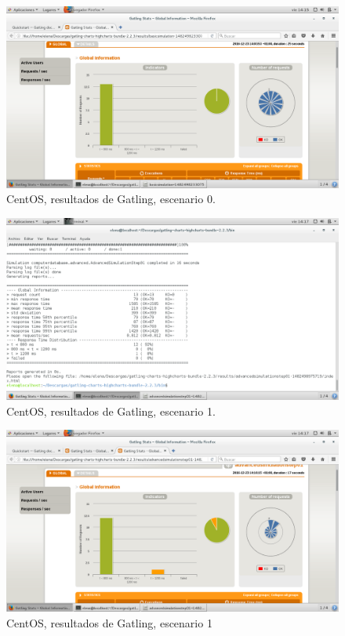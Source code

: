 \begin{figure}[H] 
	\centering
	\includegraphics[width=14.7cm]{./img/opcional1_4.png} 	
	\caption{CentOS, resultados de Gatling, escenario 0.} \label{fig:opcional1_4}
\end{figure}

\begin{figure}[H] 
	\centering
	\includegraphics[width=14.7cm]{./img/opcional1_5.png} 	
	\caption{CentOS, resultados de Gatling, escenario 1.} \label{fig:opcional1_5}
\end{figure}

\begin{figure}[H] 
	\centering
	\includegraphics[width=14.7cm]{./img/opcional1_6.png} 	
	\caption{CentOS, resultados de Gatling, escenario 1} \label{fig:opcional1_6}
\end{figure}

